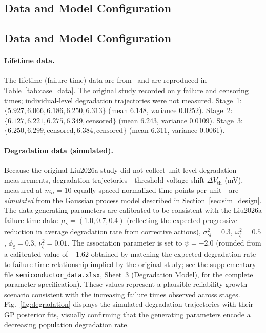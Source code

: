 \documentclass[a4paper,fleqn,longmktitle]{cas-sc}
\begin{document}
\subsection{Data and Model Configuration}

\subsection{Data and Model Configuration}

\paragraph{Lifetime data.}
The lifetime (failure time) data are from~\cite{Liu2026a} and are reproduced in Table~\ref{tab:case_data}. The original study recorded only failure and censoring times; individual-level degradation trajectories were not measured. Stage~1: $\{5.927, 6.066, 6.186, 6.250, 6.313\}$ (mean 6.148, variance 0.0252). Stage~2: $\{6.127, 6.221, 6.275, 6.349, \text{censored}\}$ (mean 6.243, variance 0.0109). Stage~3: $\{6.250, 6.299, \text{censored}, 6.384, \text{censored}\}$ (mean 6.311, variance 0.0061).

\paragraph{Degradation data (simulated).}
Because the original Liu2026a study did not collect unit-level degradation measurements, degradation trajectories---threshold voltage shift $\Delta V_{\text{th}}$ (mV), measured at $m_{li} = 10$ equally spaced normalized time points per unit---are \emph{simulated} from the Gaussian process model described in Section~\ref{sec:sim_design}. The data-generating parameters are calibrated to be consistent with the Liu2026a failure-time data: $\mu_{\gamma} = (1.0, 0.7, 0.4)$ (reflecting the expected progressive reduction in average degradation rate from corrective actions), $\sigma_{\gamma l}^2 = 0.3$, $\omega_\xi^2 = 0.5$, $\phi_\xi = 0.3$, $\nu_\xi^2 = 0.01$. The association parameter is set to $\psi = -2.0$ (rounded from a calibrated value of $-1.62$ obtained by matching the expected degradation-rate-to-failure-time relationship implied by the original study; see the supplementary file \texttt{semiconductor\_data.xlsx}, Sheet~3 (Degradation Model), for the complete parameter specification). These values represent a plausible reliability-growth scenario consistent with the increasing failure times observed across stages. Fig.~\ref{fig:degradation} displays the simulated degradation trajectories with their GP posterior fits, visually confirming that the generating parameters encode a decreasing population degradation rate.
\end{document}
